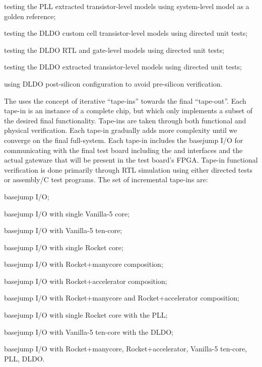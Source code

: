 \begin{cbxlist}{1.5em}{1em}{1em}
\begin{cbxlist}[--]{1.5em}{0em}{0em}
      \item testing the PLL extracted transistor-level models using
         system-level model as a golden reference;

      \item testing the DLDO custom cell transistor-level models using
         directed unit tests;

      \item testing the DLDO RTL and gate-level models using directed
         unit tests;

      \item testing the DLDO extracted transistor-level models using
         directed unit tests;

      \item using DLDO post-silicon configuration to avoid pre-silicon
         verification.

    \end{cbxlist}

 \item The  uses the
    concept of iterative ``tape-ins'' towards the final ``tape-out''.
    Each tape-in is an instance of a complete chip, but which only
    implements a subset of the desired final functionality. Tape-ins are
    taken through both functional and physical verification. Each tape-in
    gradually adds more complexity until we converge on the final
    full-system. Each tape-in includes the basejump I/O for communicating
    with the final test board including the  and
     interfaces and the actual gateware that will be present
    in the test board's FPGA. Tape-in functional verification is done
    primarily through RTL simulation using either directed tests or
    assembly/C test programs. The set of incremental tape-ins are:

    \smallskip
    \begin{cbxlist}[--]{1.5em}{0em}{0em}
      \raggedright

      \item basejump I/O;
      \item basejump I/O with single Vanilla-5 core;
      \item basejump I/O with Vanilla-5 ten-core;
      \item basejump I/O with single Rocket core;
      \item basejump I/O with Rocket+manycore composition;
      \item basejump I/O with Rocket+accelerator composition;
      \item basejump I/O with Rocket+manycore and Rocket+accelerator composition;
      \item basejump I/O with single Rocket core with the PLL;
      \item basejump I/O with Vanilla-5 ten-core with the DLDO;
      \item basejump I/O with Rocket+manycore, Rocket+accelerator,
         Vanilla-5 ten-core, PLL, DLDO.


\end{cbxlist}
\end{cbxlist}
